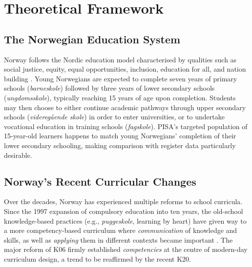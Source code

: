 \documentclass[
    a4paper,                %
    11pt,                   %
    stu,                    %
    donotrepeattitle,       %
    floatsintext,           %
    biblatex,               %
    colorlinks=true,        %
    linkcolor=red,          %
    anchorcolor=black,      %
    citecolor=blue,         %
    urlcolor=blue,          %
    bookmarks=true,         %
    bookmarksopen=false,    %
    bookmarksnumbered=true, %
    dvipsnames              %
]{apa7}
\begin{document}
\section{Theoretical Framework}


\subsection{The Norwegian Education System}

Norway follows the Nordic education model characterised by qualities such as social justice, equity, equal opportunities, inclusion, education for all, and nation building \parencite{imsen:2017}. Young Norwegians are expected to complete seven years of primary schools (\textit{barneskole}) followed by three years of lower secondary schools (\textit{ungdomsskole}), typically reaching 15 years of age upon completion. Students may then choose to either continue academic pathways through upper secondary schools (\textit{videreg{\aa}ende skole}) in order to enter universities, or to undertake vocational education in training schools (\textit{fagskole}). PISA's targeted population of 15-year-old learners happens to match young Norwegians' completion of their lower secondary schooling, making comparison with register data particularly desirable.

\subsection{Norway's Recent Curricular Changes}

Over the decades, Norway has experienced multiple reforms to school curricula. Since the 1997 expansion of compulsory education into ten years, the old-school knowledge-based practices (e.g., \textit{puggeskole}, learning by heart) have given way to a more competency-based curriculum where \emph{communication} of knowledge and skills, as well as \emph{applying} them in different contexts became important \parencite{imsen:2017}. The major reform of K06 firmly established \emph{competencies} at the centre of modern-day curriculum design, a trend to be reaffirmed by the recent K20.
\end{document}

